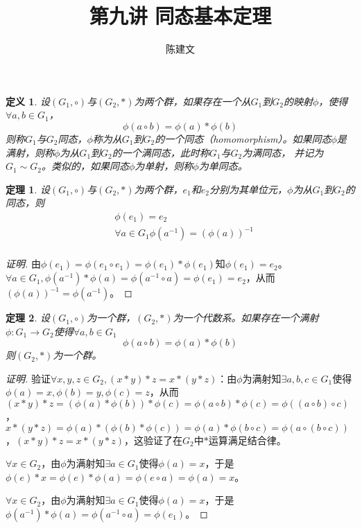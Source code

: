 \documentclass{article}
\newtheorem{Def}{定义}
\newtheorem{Thm}{定理}
\begin{document}
\begin{CJK*}{UTF8}{gbsn}
  \title{第九讲 同态基本定理}
  \author{陈建文}
  \maketitle
  

\begin{Def}
  设$(G_1,\circ)$与$(G_2,*)$为两个群，如果存在一个从$G_1$到$G_2$的映射$\phi$，使得$\forall a,b\in G_1$，\[\phi(a\circ b)=\phi(a)* \phi(b)\]
  则称$G_1$与$G_2$同态，$\phi$称为从$G_1$到$G_2$的一个同态（homomorphism）。如果同态$\phi$是满射，则称$\phi$为从$G_1$到$G_2$的一个满同态，此时称$G_1$与$G_2$为满同态，
  并记为$G_1\sim G_2$。类似的，如果同态$\phi$为单射，则称$\phi$为单同态。
\end{Def}

\begin{Thm}
  设$(G_1,\circ)$与$(G_2,*)$为两个群，$e_1$和$e_2$分别为其单位元，$\phi$为从$G_1$到$G_2$的同态，则
  \begin{align*}
    &\phi(e_1)=e_2\\
    &\forall a\in G_1 \phi(a^{-1})=(\phi(a))^{-1}\\
  \end{align*}
\end{Thm}
\begin{proof}[证明]
  由$\phi(e_1)=\phi(e_1\circ e_1)=\phi(e_1)*\phi(e_1)$知$\phi(e_1)=e_2$。
  $\forall a\in G_1, \phi(a^{-1})*\phi(a)=\phi(a^{-1}\circ a)=\phi(e_1)=e_2$，从而$(\phi(a))^{-1}=\phi(a^{-1})$。
\end{proof}
\begin{Thm}
  设$(G_1,\circ)$为一个群，$(G_2,*)$为一个代数系。如果存在一个满射$\phi:G_1\to G_2$使得$\forall a,b\in G_1$
  \[\phi(a\circ b)=\phi(a) * \phi(b)\]
  则$(G_2,*)$为一个群。
\end{Thm}
\begin{proof}[证明]
  验证$\forall x,y,z\in G_2,(x*y)*z=x*(y*z)$：由$\phi$为满射知$\exists a,b,c\in G_1$使得$\phi(a)=x,\phi(b)=y,\phi(c)=z$，从而
  $(x*y)*z=(\phi(a)*\phi(b))*\phi(c)=\phi(a\circ b)*\phi(c)=\phi((a\circ b)\circ c)$，$x*(y*z)=\phi(a)* (\phi(b)*\phi(c))=\phi(a)*\phi(b\circ c)=\phi(a\circ (b\circ c))$，$(x*y)*z=x*(y*z)$，这验证了在$G_2$中$*$运算满足结合律。

  $\forall x\in G_2$，由$\phi$为满射知$\exists a\in G_1$使得$\phi(a)=x$，于是$\phi(e)*x=\phi(e)*\phi(a)=\phi(e\circ a)=\phi(a)=x$。

  $\forall x\in G_2$，由$\phi$为满射知$\exists a\in G_1$使得$\phi(a)=x$，于是$\phi(a^{-1})*\phi(a)=\phi(a^{-1}\circ a)=\phi(e_1)$。
\end{proof}


\end{CJK*}
\end{document}
